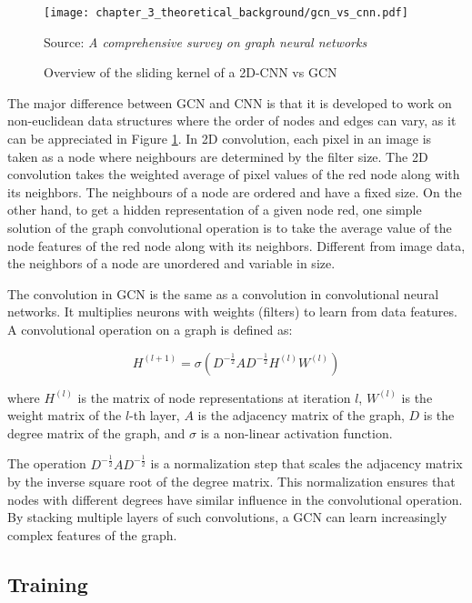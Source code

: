 \begin{figure}[h]
	\centering
	\texttt{[image: chapter\_3\_theoretical\_background/gcn\_vs\_cnn.pdf]}
	\caption{Overview of the sliding kernel of a 2D-CNN vs GCN}
	Source: \textit{A comprehensive survey on graph neural networks} \cite{wu2020comprehensive}
	\label{fig:chapter_3_theoretical_background/gcn_vs_cnn}
\end{figure}

The major difference between GCN and CNN is that it is developed to work on non-euclidean data structures where the order of nodes and edges can vary, as it can be appreciated in Figure \ref{fig:chapter_3_theoretical_background/gcn_vs_cnn}. In 2D convolution, each pixel in an image is taken as a node where neighbours are determined by the filter size. The 2D convolution takes the weighted average of pixel values of the red node along with its neighbors. The neighbours of a node are ordered and have a fixed size. On the other hand, to get a hidden representation of a given node red, one simple solution of the graph convolutional operation is to take the average value of the node features of the red node along with its neighbors. Different from image data, the neighbors of a node are unordered and variable in size.

The convolution in GCN is the same as a convolution in convolutional neural networks. It multiplies neurons with weights (filters) to learn from data features. A convolutional operation on a graph is defined as:

\begin{equation}
H^{(l+1)} = \sigma(D^{-\frac{1}{2}} A D^{-\frac{1}{2}} H^{(l)} W^{(l)})
\end{equation}

where $H^{(l)}$ is the matrix of node representations at iteration $l$, $W^{(l)}$ is the weight matrix of the $l$-th layer, $A$ is the adjacency matrix of the graph, $D$ is the degree matrix of the graph, and $\sigma$ is a non-linear activation function.

The operation $D^{-\frac{1}{2}} A D^{-\frac{1}{2}}$ is a normalization step that scales the adjacency matrix by the inverse square root of the degree matrix. This normalization ensures that nodes with different degrees have similar influence in the convolutional operation. By stacking multiple layers of such convolutions, a GCN can learn increasingly complex features of the graph.

\subsection{Training}
\label{subsec:3_training}

